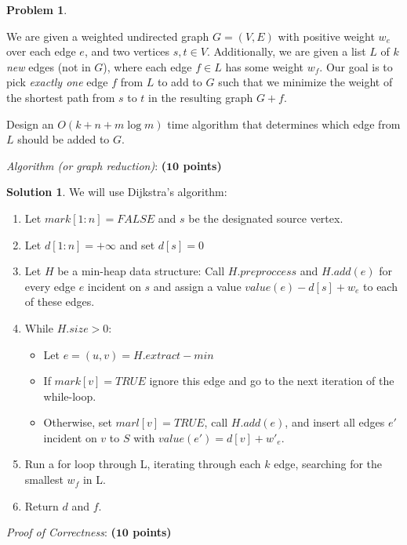 \documentclass{article}
\theoremstyle{definition}
\newtheorem{problem}{Problem}
\newtheorem*{solution*}{Solution}
\newenvironment{solution}{\begin{solution*}}{{} \end{solution*}}
\newcommand{\grade}[1]{\hfill{\textbf{($\mathbf{#1}$ points)}}}
\begin{document}
\begin{problem}\label{sp}

We are given a weighted undirected graph $G=(V,E)$ with positive weight $w_e$ over each edge $e$, and two vertices $s,t \in V$. Additionally, we are given a list $L$ of $k$ \emph{new} edges (not in $G$), where each edge $f \in L$ has some weight $w_f$. 
Our goal is to pick \emph{exactly one} edge $f$ from $L$ to add to $G$ such that we minimize the weight of the shortest path from $s$ to $t$ in the resulting graph $G+f$. 

Design an $O(k+n+m\log{m})$ time algorithm that determines which edge from $L$ should be added to $G$. 

\begin{enumerate}
	\item[(a)] \emph{Algorithm (or graph reduction)}: \grade{10} 
	
	
\begin{solution}
	\item We will use Dijkstra's algorithm:
	\begin{enumerate}
	\item  Let $mark[1 :n] = FALSE$ and $s$ be the designated source vertex.
	\item Let $d[1: n] = +\infty$ and set $d[s] = 0$
	\item Let $H$ be a min-heap data structure: Call $H.preproccess$ and $H.add(e)$ for every edge $e$ incident on $s$ and assign a value $value(e) - d[s] + w_e$ to each of these edges.
	\item While $H.size > 0$:
		\begin{itemize}
		\item Let $e = (u, v) = H.extract-min$ 
		\item If $mark[v] = TRUE$ ignore this edge and go to the next iteration of the while-loop.
		\item Otherwise, set $marl[v] = TRUE$, call $H.add(e)$, and insert all edges $e'$ incident on $v$ to $S$ with $value(e') = d[v] + w'_e$.
		\end{itemize}
	\item Run a for loop through L, iterating through each $k$ edge, searching for the smallest $w_f$ in L.
	\item Return $d$ and $f$.

	\end{enumerate}
\end{solution}

	\newpage
	\item[(b)] \emph{Proof of Correctness}: \grade{10} 



\end{enumerate}
\end{problem}
\end{document}
